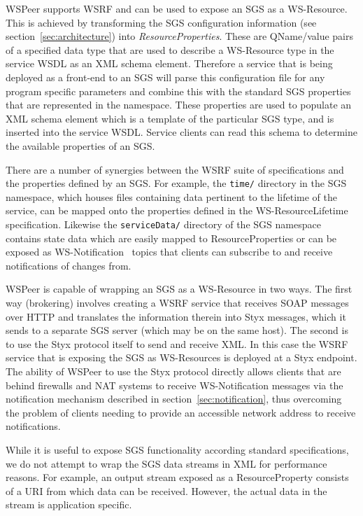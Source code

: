 \documentclass[a4paper]{article}
\begin{document}
WSPeer supports WSRF and can be used to expose an SGS as a WS-Resource. This is achieved by transforming the SGS configuration information (see section~\ref{sec:architecture}) into \textit{ResourceProperties\/}. These are QName/value pairs of a specified data type that are used to describe a WS-Resource type in the service WSDL as an XML schema element. Therefore a service that is being deployed as a front-end to an SGS will parse this configuration file for any program specific parameters and combine this with the standard SGS properties that are represented in the namespace. These properties are used to populate an XML schema element which is a template of the particular SGS type, and is inserted into the service WSDL. Service clients can read this schema to determine the available properties of an SGS.

There are a number of synergies between the WSRF suite of specifications and the properties defined by an SGS. For example, the \texttt{time/} directory in the SGS namespace, which houses files containing data pertinent to the lifetime of the service, can be mapped onto the properties defined in the WS-ResourceLifetime~\cite{wsrf-lifetime} specification. Likewise the \texttt{serviceData/} directory of the SGS namespace contains state data which are easily mapped to ResourceProperties or can be exposed as WS-Notification~\cite{wsrf-notification} topics that clients can subscribe to and receive notifications of changes from.

WSPeer is capable of wrapping an SGS as a WS-Resource in two ways.  The first way (brokering) involves creating a WSRF service that receives SOAP messages over HTTP and translates the information therein into Styx messages, which it sends to a separate SGS server (which may be on the same host). The second is to use the Styx protocol itself to send and receive XML. In this case the WSRF service that is exposing the SGS as WS-Resources is deployed at a Styx endpoint. The ability of WSPeer to use the Styx protocol directly allows clients that are behind firewalls and NAT systems to receive WS-Notification messages via the notification mechanism described in section~\ref{sec:notification}, thus overcoming the problem of clients needing to provide an accessible network address to receive notifications.

While it is useful to expose SGS functionality according standard specifications, we do not attempt to wrap the SGS data streams in XML for performance reasons. For example, an output stream exposed as a ResourceProperty consists of a URI from which data can be received. However, the actual data in the stream is application specific.
\end{document}
